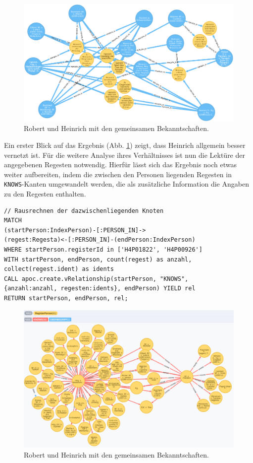 \documentclass[ngerman,]{scrreprt}
\begin{document}
\begin{figure}
\centering
\includegraphics{Bilder/RI2Graph/RobertundHeinrichMitBrokern.png}
\caption{Robert und Heinrich mit den gemeinsamen Bekanntschaften.}
\label{robertundheinrichundmehr}
\end{figure}

Ein erster Blick auf das Ergebnis (Abb. \ref{robertundheinrichundmehr}) zeigt, dass Heinrich allgemein besser vernetzt ist. Für die weitere Analyse ihres Verhältnisses ist nun die Lektüre der angegebenen Regesten notwendig. Hierfür lässt sich das Ergebnis noch etwas weiter aufbereiten, indem die zwischen den Personen liegenden Regesten in \texttt{KNOWS}-Kanten umgewandelt werden, die als zusätzliche Information die Angaben zu den Regesten enthalten.

\begin{verbatim}
// Rausrechnen der dazwischenliegenden Knoten
MATCH
(startPerson:IndexPerson)-[:PERSON_IN]->
(regest:Regesta)<-[:PERSON_IN]-(endPerson:IndexPerson)
WHERE startPerson.registerId in ['H4P01822', 'H4P00926']
WITH startPerson, endPerson, count(regest) as anzahl,
collect(regest.ident) as idents
CALL apoc.create.vRelationship(startPerson, "KNOWS",
{anzahl:anzahl, regesten:idents}, endPerson) YIELD rel
RETURN startPerson, endPerson, rel;
\end{verbatim}

\begin{figure}
\centering
\includegraphics{Bilder/RI2Graph/RobertUndHeinrichApoc.png}
\caption{Robert und Heinrich mit den gemeinsamen Bekanntschaften.}
\label{robertundheinrichapoc}
\end{figure}
\end{document}
